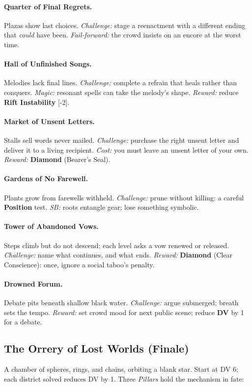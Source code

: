 \documentclass[11pt]{article}
\newcommand{\Clock}[2]{\textbf{#1} [#2]}
\newcommand{\Term}[1]{\textbf{#1}}
\newcommand{\DV}{\Term{DV}}
\newcommand{\Position}{\Term{Position}}
\newcommand{\Diamond}{\Term{Diamond}}
\begin{document}
\paragraph{Quarter of Final Regrets.} Plazas show last choices. \emph{Challenge:} stage a reenactment with a different ending that \emph{could} have been. \emph{Fail-forward:} the crowd insists on an encore at the worst time.

\paragraph{Hall of Unfinished Songs.} Melodies lack final lines. \emph{Challenge:} complete a refrain that heals rather than conquers. \emph{Magic:} resonant spells can take the melody's shape. \emph{Reward:} reduce \Clock{Rift Instability}{-2}.

\paragraph{Market of Unsent Letters.} Stalls sell words never mailed. \emph{Challenge:} purchase the right unsent letter and deliver it to a living recipient. \emph{Cost:} you must leave an unsent letter of your own. \emph{Reward:} \Diamond{} (Bearer's Seal).

\paragraph{Gardens of No Farewell.} Plants grow from farewells withheld. \emph{Challenge:} prune without killing: a careful \Position{} test. \emph{SB:} roots entangle gear; lose something symbolic.

\paragraph{Tower of Abandoned Vows.} Steps climb but do not descend; each level asks a vow renewed or released. \emph{Challenge:} name what continues, and what ends. \emph{Reward:} \Diamond{} (Clear Conscience): once, ignore a social taboo's penalty.

\paragraph{Drowned Forum.} Debate pits beneath shallow black water. \emph{Challenge:} argue submerged; breath sets the tempo. \emph{Reward:} set crowd mood for next public scene; reduce \DV{} by 1 for a debate.

\subsection*{The Orrery of Lost Worlds (Finale)}
A chamber of spheres, rings, and chains, orbiting a blank star. Start at DV 6; each district solved reduces DV by 1. Three \emph{Pillars} hold the mechanism in fate:
\end{document}
